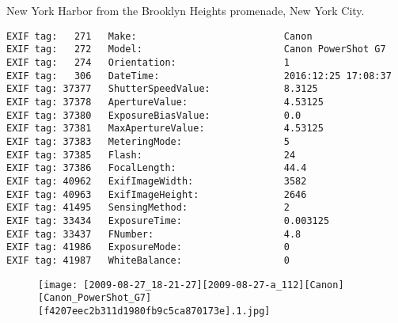 \section{\protect{}}
\noindent New York Harbor from the Brooklyn Heights promenade, New York City.
\noindent
\begin{lstlisting}
EXIF tag:   271   Make:                          Canon
EXIF tag:   272   Model:                         Canon PowerShot G7
EXIF tag:   274   Orientation:                   1
EXIF tag:   306   DateTime:                      2016:12:25 17:08:37
EXIF tag: 37377   ShutterSpeedValue:             8.3125
EXIF tag: 37378   ApertureValue:                 4.53125
EXIF tag: 37380   ExposureBiasValue:             0.0
EXIF tag: 37381   MaxApertureValue:              4.53125
EXIF tag: 37383   MeteringMode:                  5
EXIF tag: 37385   Flash:                         24
EXIF tag: 37386   FocalLength:                   44.4
EXIF tag: 40962   ExifImageWidth:                3582
EXIF tag: 40963   ExifImageHeight:               2646
EXIF tag: 41495   SensingMethod:                 2
EXIF tag: 33434   ExposureTime:                  0.003125
EXIF tag: 33437   FNumber:                       4.8
EXIF tag: 41986   ExposureMode:                  0
EXIF tag: 41987   WhiteBalance:                  0

\end{lstlisting}
\clearpage
\begin{figure}
\raggedleft
\texttt{[image: [2009-08-27\_18-21-27][2009-08-27-a\_112][Canon][Canon\_PowerShot\_G7][f4207eec2b311d1980fb9c5ca870173e].1.jpg]}
\end{figure}


\clearpage
